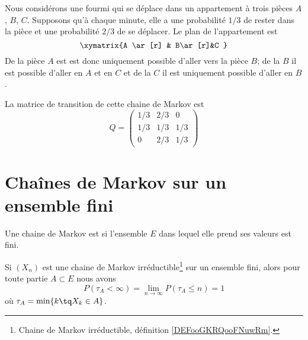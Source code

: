 \begin{example}
	Nous considérons une fourmi qui se déplace dans un appartement à trois pièces \( A\), \( B\), \( C\). Supposons qu'à chaque minute, elle a une probabilité \( 1/3\) de rester dans la pièce et une probabilité \( 2/3\) de se déplacer. Le plan de l'appartement est
	\begin{equation}
		\xymatrix{%
			A \ar[r]      &  B\ar[r]&C
		}
	\end{equation}
	De la pièce \( A\) est est donc uniquement possible d'aller vers la pièce \( B\); de la \( B\) il est possible d'aller en \( A\) et en \( C\) et de la \( C\) il est uniquement possible d'aller en \( B\).

	La matrice de transition de cette chaine de Markov est
	\begin{equation}
		Q=\begin{pmatrix}
			1/3 & 2/3 & 0   \\
			1/3 & 1/3 & 1/3 \\
			0   & 2/3 & 1/3
		\end{pmatrix}
	\end{equation}
\end{example}


\section{Chaînes de Markov sur un ensemble fini}

\begin{definition}
	Une chaine de Markov est  si l'ensemble \( E\) dans lequel elle prend ses valeurs est fini.
\end{definition}

\begin{proposition}     \label{PROPooCAORooMEaxtq}
    Si \( (X_n)\) est une chaine de Markov irréductible\footnote{Chaine de Markov irréductible, définition \ref{DEFooGKRQooFNuwRm}.} sur un ensemble fini, alors pour toute partie \( A\subset E\) nous avons
	\begin{equation}
		P(\tau_A<\infty)=\lim_{n\to \infty} P(\tau_A\leq n)=1
	\end{equation}
	où \( \tau_A=\min\{ k\tq X_k\in A \}\).
\end{proposition}

